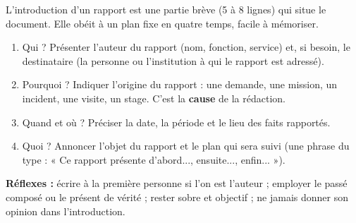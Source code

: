 \documentclass[11pt]{article}
\newcommand{\cle}[1]{{\popxbold\color{popdark}#1}}
\begin{document}
\begin{methode}
L'introduction d'un rapport est une partie brève (5 à 8 lignes) qui situe le document. Elle obéit à un plan fixe en quatre temps, facile à mémoriser.
\begin{enumerate}
\item \cle{Qui ?} Présenter l'auteur du rapport (nom, fonction, service) et, si besoin, le destinataire (la personne ou l'institution à qui le rapport est adressé).
\item \cle{Pourquoi ?} Indiquer l'origine du rapport : une demande, une mission, un incident, une visite, un stage. C'est la \textbf{cause} de la rédaction.
\item \cle{Quand et où ?} Préciser la date, la période et le lieu des faits rapportés.
\item \cle{Quoi ?} Annoncer l'objet du rapport et le plan qui sera suivi (une phrase du type : « Ce rapport présente d'abord..., ensuite..., enfin... »).
\end{enumerate}
\textbf{Réflexes :} écrire à la première personne si l'on est l'auteur ; employer le passé composé ou le présent de vérité ; rester sobre et objectif ; ne jamais donner son opinion dans l'introduction.
\end{methode}
\end{document}
